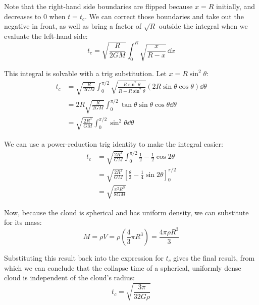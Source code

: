 \documentclass{article}
\begin{document}
Note that the right-hand side boundaries are flipped because $x = R$ initially, and decreases to $0$ when $t = t_c$. We can correct those boundaries and take out the negative in front, as well as bring a factor of $\sqrt{R}$ outside the integral when we evaluate the left-hand side:
\begin{equation*}
t_c = \sqrt{\frac{R}{2GM}} \int_0^R \sqrt{\frac{x}{R-x}} \, \dd{x}
\end{equation*}

This integral is solvable with a trig substitution. Let $x = R{\sin}^2 \theta$:
\begin{equation*}
\begin{aligned}
    t_c &= \sqrt{\frac{R}{2GM}} \int_0^{\pi/2} \sqrt{\frac{R{\sin}^2 \theta}{R-R{\sin}^2 \theta}}(2R\sin\theta \cos\theta)\dd{\theta} \\
    &= 2R \sqrt{\frac{R}{2GM}} \int_0^{\pi/2} \tan\theta \sin\theta \cos\theta\dd{\theta} \\
    &= \sqrt{\frac{2R^3}{GM}} \int_0^{\pi/2} \sin^2\theta\dd{\theta}
\end{aligned}
\end{equation*}

We can use a power-reduction trig identity to make the integral easier:
\begin{equation*}
\begin{aligned}
    t_c &= \sqrt{\frac{2R^3}{GM}} \int_0^{\pi/2} \frac{1}{2} - \frac{1}{2} \cos 2\theta \\
    &= \sqrt{\frac{2R^3}{GM}} \left[\frac{\theta}{2} - \frac{1}{4} \sin 2\theta\right]^{\pi/2}_0 \\
    &= \sqrt{\frac{\pi^2 R^3}{8GM}}
\end{aligned}
\end{equation*}

Now, because the cloud is spherical and has uniform density, we can substitute for its mass:
\begin{equation*}
M = \rho V = \rho \left(\frac{4}{3}\pi R^3\right) = \frac{4\pi\rho R^3}{3}
\end{equation*}

Substituting this result back into the expression for $t_c$ gives the final result, from which we can conclude that the collapse time of a spherical, uniformly dense cloud is independent of the cloud's radius:
\begin{equation*}
t_c = \sqrt{\frac{3\pi}{32G\rho}}
\end{equation*}
\end{document}
